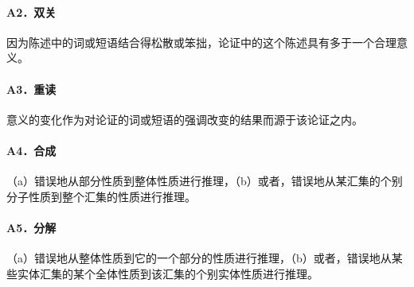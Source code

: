 \paragraph{A2．双关}
因为陈述中的词或短语结合得松散或笨拙，论证中的这个陈述具有多于一个合理意义。

\paragraph{A3．重读}
意义的变化作为对论证的词或短语的强调改变的结果而源于该论证之内。

\paragraph{A4．合成}
（a）错误地从部分性质到整体性质进行推理，（b）或者，错误地从某汇集的个别分子性质到整个汇集的性质进行推理。

\paragraph{A5．分解}
（a）错误地从整体性质到它的一个部分的性质进行推理，（b）或者，错误地从某些实体汇集的某个全体性质到该汇集的个别实体性质进行推理。

\begin{center}
\end{center} 

\printbibliography[heading=subbibliography,title={第4章参考文献}] 